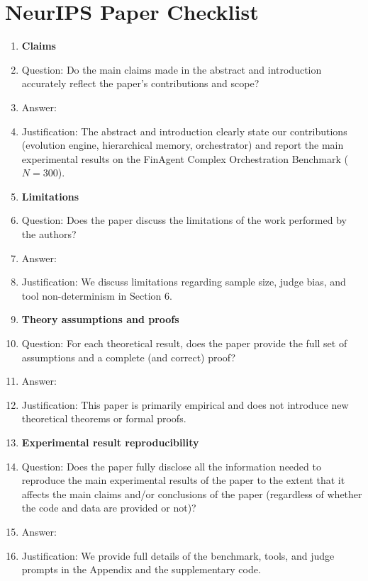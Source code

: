 \section*{NeurIPS Paper Checklist}


\begin{enumerate}

\item {\bf Claims}
    \item[] Question: Do the main claims made in the abstract and introduction accurately reflect the paper's contributions and scope?
    \item[] Answer: \answerYes{} 
    \item[] Justification: The abstract and introduction clearly state our contributions (evolution engine, hierarchical memory, orchestrator) and report the main experimental results on the FinAgent Complex Orchestration Benchmark ($N=300$).

\item {\bf Limitations}
    \item[] Question: Does the paper discuss the limitations of the work performed by the authors?
    \item[] Answer: \answerYes{} 
    \item[] Justification: We discuss limitations regarding sample size, judge bias, and tool non-determinism in Section 6.

\item {\bf Theory assumptions and proofs}
    \item[] Question: For each theoretical result, does the paper provide the full set of assumptions and a complete (and correct) proof?
    \item[] Answer: \answerNA{} 
    \item[] Justification: This paper is primarily empirical and does not introduce new theoretical theorems or formal proofs.

    \item {\bf Experimental result reproducibility}
    \item[] Question: Does the paper fully disclose all the information needed to reproduce the main experimental results of the paper to the extent that it affects the main claims and/or conclusions of the paper (regardless of whether the code and data are provided or not)?
    \item[] Answer: \answerYes{} 
    \item[] Justification: We provide full details of the benchmark, tools, and judge prompts in the Appendix and the supplementary code.


\end{enumerate}
